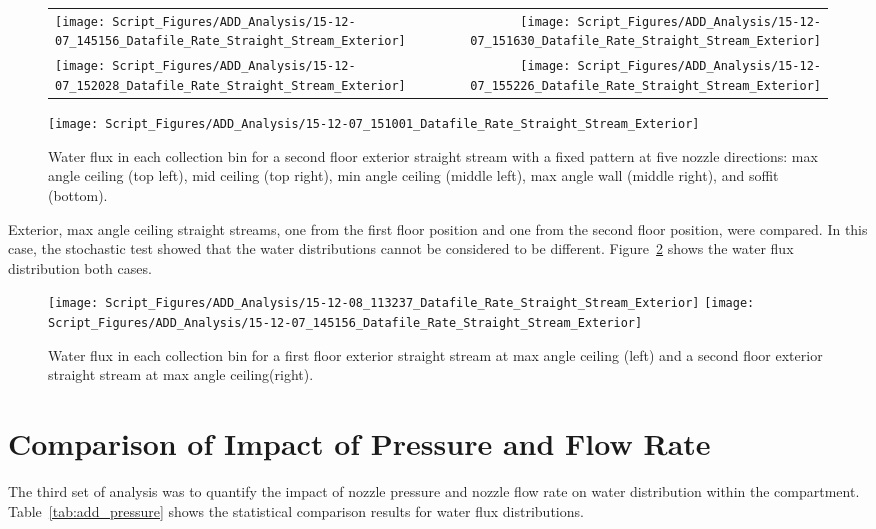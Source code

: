 \documentclass[12pt,oneside]{book}
\begin{document}
\begin{figure}[ht]
\begin{tabular*}{\textwidth}{lr}
\texttt{[image: Script\_Figures/ADD\_Analysis/15-12-07\_145156\_Datafile\_Rate\_Straight\_Stream\_Exterior]} &
\texttt{[image: Script\_Figures/ADD\_Analysis/15-12-07\_151630\_Datafile\_Rate\_Straight\_Stream\_Exterior]} \\
\texttt{[image: Script\_Figures/ADD\_Analysis/15-12-07\_152028\_Datafile\_Rate\_Straight\_Stream\_Exterior]} &
\texttt{[image: Script\_Figures/ADD\_Analysis/15-12-07\_155226\_Datafile\_Rate\_Straight\_Stream\_Exterior]} \\
\end{tabular*}
\centering
\texttt{[image: Script\_Figures/ADD\_Analysis/15-12-07\_151001\_Datafile\_Rate\_Straight\_Stream\_Exterior]}
\caption[Water Flux for Varying Nozzle Direction with Fixed Second Floor Exterior Straight Stream]{Water flux in each collection bin for a second floor exterior straight stream with a fixed pattern at five nozzle directions: max angle ceiling (top left), mid ceiling (top right), min angle ceiling (middle left), max angle wall (middle right), and soffit (bottom).}
\label{fig:Exterior_Second_Floor_Varying_Nozzle_Directions_SS_Fixed_Pattern}
\end{figure}

\clearpage
Exterior, max angle ceiling straight streams, one from the first floor position and one from the second floor position, were compared. In this case, the stochastic test showed that the water distributions cannot be considered to be different. Figure~\ref{fig:Exterior_First_Floor_Second_Floor} shows the water flux distribution both cases.

\begin{figure}[ht]
\texttt{[image: Script\_Figures/ADD\_Analysis/15-12-08\_113237\_Datafile\_Rate\_Straight\_Stream\_Exterior]}
\texttt{[image: Script\_Figures/ADD\_Analysis/15-12-07\_145156\_Datafile\_Rate\_Straight\_Stream\_Exterior]} \\ 
\caption[Water Flux for Same Nozzle Direction Varying Exterior Floor]{Water flux in each collection bin for a first floor exterior straight stream at max angle ceiling (left) and a second floor exterior straight stream at max angle ceiling(right).}
\label{fig:Exterior_First_Floor_Second_Floor}
\end{figure}

\section{Comparison of Impact of Pressure and Flow Rate}
\label{sec:pressure}
The third set of analysis was to quantify the impact of nozzle pressure and nozzle flow rate on water distribution within the compartment. Table~\ref{tab:add_pressure} shows the statistical comparison results for water flux distributions. 
\end{document}

